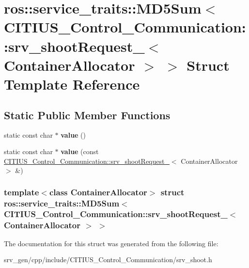 \hypertarget{structros_1_1service__traits_1_1_m_d5_sum_3_01_c_i_t_i_u_s___control___communication_1_1srv__sho29d3e934848ed4164df81fa9def9c38e}{\section{ros\-:\-:service\-\_\-traits\-:\-:\-M\-D5\-Sum$<$ \-C\-I\-T\-I\-U\-S\-\_\-\-Control\-\_\-\-Communication\-:\-:srv\-\_\-shoot\-Request\-\_\-$<$ \-Container\-Allocator $>$ $>$ \-Struct \-Template \-Reference}
\label{structros_1_1service__traits_1_1_m_d5_sum_3_01_c_i_t_i_u_s___control___communication_1_1srv__sho29d3e934848ed4164df81fa9def9c38e}
}
\subsection*{\-Static \-Public \-Member \-Functions}
\begin{DoxyCompactItemize}
\item 
\hypertarget{structros_1_1service__traits_1_1_m_d5_sum_3_01_c_i_t_i_u_s___control___communication_1_1srv__sho29d3e934848ed4164df81fa9def9c38e_a9d323c8963719017da9d6a572c4bcdf5}{static const char $\ast$ {\bfseries value} ()}\label{structros_1_1service__traits_1_1_m_d5_sum_3_01_c_i_t_i_u_s___control___communication_1_1srv__sho29d3e934848ed4164df81fa9def9c38e_a9d323c8963719017da9d6a572c4bcdf5}

\item 
\hypertarget{structros_1_1service__traits_1_1_m_d5_sum_3_01_c_i_t_i_u_s___control___communication_1_1srv__sho29d3e934848ed4164df81fa9def9c38e_acd7a95ead433cb3480e7b20b3f645c5c}{static const char $\ast$ {\bfseries value} (const \hyperlink{struct_c_i_t_i_u_s___control___communication_1_1srv__shoot_request__}{\-C\-I\-T\-I\-U\-S\-\_\-\-Control\-\_\-\-Communication\-::srv\-\_\-shoot\-Request\-\_\-}$<$ \-Container\-Allocator $>$ \&)}\label{structros_1_1service__traits_1_1_m_d5_sum_3_01_c_i_t_i_u_s___control___communication_1_1srv__sho29d3e934848ed4164df81fa9def9c38e_acd7a95ead433cb3480e7b20b3f645c5c}

\end{DoxyCompactItemize}
\subsubsection*{template$<$class Container\-Allocator$>$ struct ros\-::service\-\_\-traits\-::\-M\-D5\-Sum$<$ C\-I\-T\-I\-U\-S\-\_\-\-Control\-\_\-\-Communication\-::srv\-\_\-shoot\-Request\-\_\-$<$ Container\-Allocator $>$ $>$}



\-The documentation for this struct was generated from the following file\-:\begin{DoxyCompactItemize}
\item 
srv\-\_\-gen/cpp/include/\-C\-I\-T\-I\-U\-S\-\_\-\-Control\-\_\-\-Communication/srv\-\_\-shoot.\-h\end{DoxyCompactItemize}
